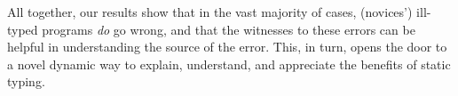 %
%
%
%
%
%

\smallskip
All together, our results show that in the vast majority of cases, (novices') ill-typed
programs \emph{do} go wrong, and that the witnesses to these errors can be
helpful in understanding the source of the error. This, in turn, opens the
door to a novel dynamic way to explain, understand, and appreciate the
benefits of static typing.


